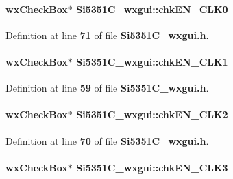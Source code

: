 \paragraph[{chk\+E\+N\+\_\+\+C\+L\+K0}]{\setlength{\rightskip}{0pt plus 5cm}wx\+Check\+Box$\ast$ Si5351\+C\+\_\+wxgui\+::chk\+E\+N\+\_\+\+C\+L\+K0}\label{classSi5351C__wxgui_ace91561496e91e32fa62b84a9dd2e110}


Definition at line {\bf 71} of file {\bf Si5351\+C\+\_\+wxgui.\+h}.

\paragraph[{chk\+E\+N\+\_\+\+C\+L\+K1}]{\setlength{\rightskip}{0pt plus 5cm}wx\+Check\+Box$\ast$ Si5351\+C\+\_\+wxgui\+::chk\+E\+N\+\_\+\+C\+L\+K1}\label{classSi5351C__wxgui_ac911a4b7c298998f7832529f84e813e5}


Definition at line {\bf 59} of file {\bf Si5351\+C\+\_\+wxgui.\+h}.

\paragraph[{chk\+E\+N\+\_\+\+C\+L\+K2}]{\setlength{\rightskip}{0pt plus 5cm}wx\+Check\+Box$\ast$ Si5351\+C\+\_\+wxgui\+::chk\+E\+N\+\_\+\+C\+L\+K2}\label{classSi5351C__wxgui_aa16600e1969adf338065ed1a1c7bafa3}


Definition at line {\bf 70} of file {\bf Si5351\+C\+\_\+wxgui.\+h}.

\paragraph[{chk\+E\+N\+\_\+\+C\+L\+K3}]{\setlength{\rightskip}{0pt plus 5cm}wx\+Check\+Box$\ast$ Si5351\+C\+\_\+wxgui\+::chk\+E\+N\+\_\+\+C\+L\+K3}\label{classSi5351C__wxgui_aa9f9091b4252d72b7a95391380615dd6}


